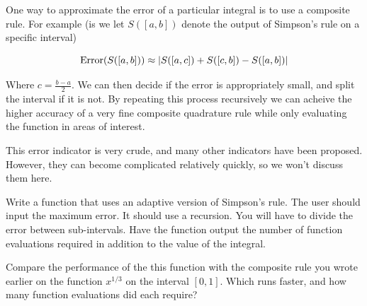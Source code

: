 One way to approximate the error of a particular integral is to use a composite rule. For example (is we let $S([a,b])$ denote the output of Simpson's rule on a specific interval)

\[
\mbox{Error}(S([a,b])) \approx \lvert S([a,c]) + S([c,b]) - S([a,b])\rvert
\]

Where $c = \frac{b-a}{2}$. We can then decide if the error is appropriately small, and split the interval if it is not. By repeating this process recursively we can acheive the higher accuracy of a very fine composite quadrature rule while only evaluating the function in areas of interest.

This error indicator is very crude, and many other indicators have been proposed. However, they can become complicated relatively quickly, so we won't discuss them here. 

\begin{problem}
Write a function that uses an adaptive version of Simpson's rule. The user should input the maximum error. It should use a recursion. You will have to divide the error between sub-intervals. Have the function output the number of function evaluations required in addition to the value of the integral.

Compare the performance of the this function with the composite rule you wrote earlier on the function $x^{1/3}$ on the interval $[0,1]$. Which runs faster, and how many function evaluations did each require?
\end{problem}
